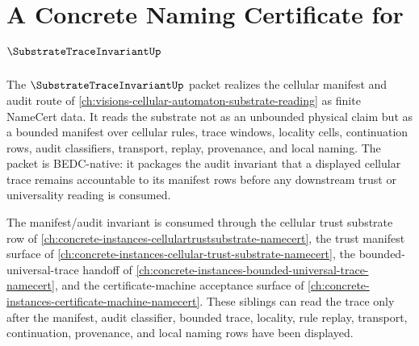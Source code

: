 \chapter{A Concrete Naming Certificate for $\SubstrateTraceInvariantUp$}
\label{ch:concrete-instances-substrate-trace-invariant-namecert}

The $\SubstrateTraceInvariantUp$ packet realizes the cellular manifest and audit route of \autoref{ch:visions-cellular-automaton-substrate-reading} as finite NameCert data. It reads the substrate not as an unbounded physical claim but as a bounded manifest over cellular rules, trace windows, locality cells, continuation rows, audit classifiers, transport, replay, provenance, and local naming. The packet is BEDC-native: it packages the audit invariant that a displayed cellular trace remains accountable to its manifest rows before any downstream trust or universality reading is consumed.

The manifest/audit invariant is consumed through the cellular trust substrate row of \autoref{ch:concrete-instances-cellulartrustsubstrate-namecert}, the trust manifest surface of \autoref{ch:concrete-instances-cellular-trust-substrate-namecert}, the bounded-universal-trace handoff of \autoref{ch:concrete-instances-bounded-universal-trace-namecert}, and the certificate-machine acceptance surface of \autoref{ch:concrete-instances-certificate-machine-namecert}. These siblings can read the trace only after the manifest, audit classifier, bounded trace, locality, rule replay, transport, continuation, provenance, and local naming rows have been displayed.

